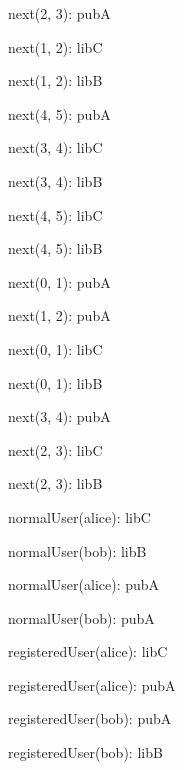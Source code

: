 \documentclass{article}
\newenvironment{states}
        {\begin{minipage}{\tableWidth}\raggedright\begin{description}[align=left,leftmargin=1em,noitemsep,labelsep=\parindent]}
        {\end{description}\end{minipage}}
\begin{document}
{\begin{states}
\item{{next(\allowbreak{}2, 3): pubA}}
\item{{next(\allowbreak{}1, 2): libC}}
\item{{next(\allowbreak{}1, 2): libB}}
\item{{next(\allowbreak{}4, 5): pubA}}
\item{{next(\allowbreak{}3, 4): libC}}
\item{{next(\allowbreak{}3, 4): libB}}
\item{{next(\allowbreak{}4, 5): libC}}
\item{{next(\allowbreak{}4, 5): libB}}
\item{{next(\allowbreak{}0, 1): pubA}}
\item{{next(\allowbreak{}1, 2): pubA}}
\item{{next(\allowbreak{}0, 1): libC}}
\item{{next(\allowbreak{}0, 1): libB}}
\item{{next(\allowbreak{}3, 4): pubA}}
\item{{next(\allowbreak{}2, 3): libC}}
\item{{next(\allowbreak{}2, 3): libB}}
\item{{normalUser(\allowbreak{}alice): libC}}
\item{{normalUser(\allowbreak{}bob): libB}}
\item{{normalUser(\allowbreak{}alice): pubA}}
\item{{normalUser(\allowbreak{}bob): pubA}}
\item{{registeredUser(\allowbreak{}alice): libC}}
\item{{registeredUser(\allowbreak{}alice): pubA}}
\item{{registeredUser(\allowbreak{}bob): pubA}}
\item{{registeredUser(\allowbreak{}bob): libB}}
\end{states}}
\end{document}
